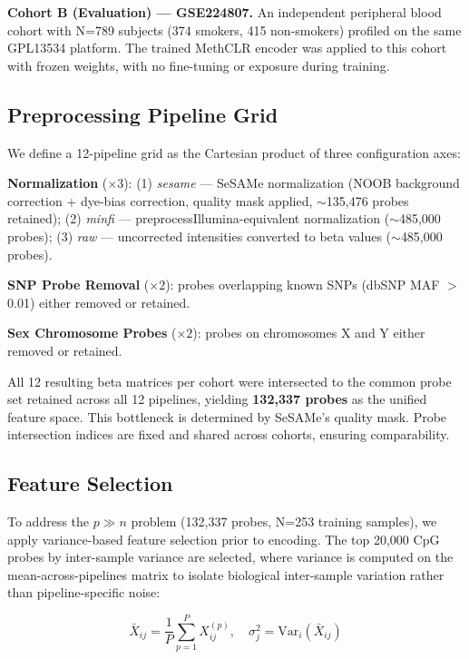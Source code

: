 \documentclass[conference]{IEEEtran}
\begin{document}
\textbf{Cohort B (Evaluation) — GSE224807.} An independent peripheral blood cohort with N=789 subjects (374 smokers, 415 non-smokers) profiled on the same GPL13534 platform. The trained MethCLR encoder was applied to this cohort with frozen weights, with no fine-tuning or exposure during training.

\subsection{Preprocessing Pipeline Grid}

We define a 12-pipeline grid as the Cartesian product of three configuration axes:

\textbf{Normalization} ($\times 3$): (1) \textit{sesame} — SeSAMe normalization (NOOB background correction + dye-bias correction, quality mask applied, $\sim$135,476 probes retained); (2) \textit{minfi} — preprocessIllumina-equivalent normalization ($\sim$485,000 probes); (3) \textit{raw} — uncorrected intensities converted to beta values ($\sim$485,000 probes).

\textbf{SNP Probe Removal} ($\times 2$): probes overlapping known SNPs (dbSNP MAF $>$ 0.01) either removed or retained.

\textbf{Sex Chromosome Probes} ($\times 2$): probes on chromosomes X and Y either removed or retained.

All 12 resulting beta matrices per cohort were intersected to the common probe set retained across all 12 pipelines, yielding \textbf{132,337 probes} as the unified feature space. This bottleneck is determined by SeSAMe's quality mask. Probe intersection indices are fixed and shared across cohorts, ensuring comparability.

\subsection{Feature Selection}

To address the $p \gg n$ problem (132,337 probes, N=253 training samples), we apply variance-based feature selection prior to encoding. The top 20,000 CpG probes by inter-sample variance are selected, where variance is computed on the mean-across-pipelines matrix to isolate biological inter-sample variation rather than pipeline-specific noise:

\begin{equation}
\bar{X}_{ij} = \frac{1}{P}\sum_{p=1}^{P} X^{(p)}_{ij}, \quad \sigma^2_j = \text{Var}_i(\bar{X}_{ij})
\label{eq:featsel}
\end{equation}
\end{document}

